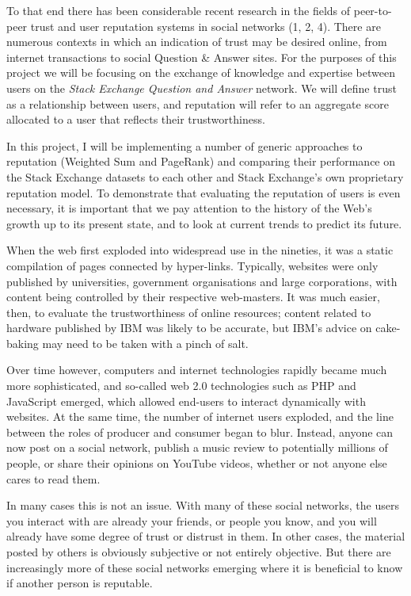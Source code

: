 \documentclass[]{final_report}
\begin{document}
To that end there has been considerable recent research in the fields of peer-to-peer trust and user reputation systems in social networks (1, 2, 4). There are numerous contexts in which an indication of trust may be desired online, from internet transactions to social Question \& Answer sites. For the purposes of this project we will be focusing on the exchange of knowledge and expertise between users on the \textsl{Stack Exchange Question and Answer} network. We will define trust as a relationship between users, and reputation will refer to an aggregate score allocated to a user that reflects their trustworthiness.

In this project, I will be implementing a number of generic approaches to reputation (Weighted Sum and PageRank) and comparing their performance on the Stack Exchange datasets to each other and Stack Exchange's own proprietary reputation model. To demonstrate that evaluating the reputation of users is even necessary, it is important that we pay attention to the history of the Web's growth up to its present state, and to look at current trends to predict its future.

When the web first exploded into widespread use in the nineties, it was a static compilation of pages connected by hyper-links. Typically, websites were only published by universities, government organisations and large corporations, with content being controlled by their respective web-masters. It was much easier, then, to evaluate the trustworthiness of online resources; content related to hardware published by IBM was likely to be accurate, but IBM's advice on cake-baking may need to be taken with a pinch of salt.

Over time however, computers and internet technologies rapidly became much more sophisticated, and so-called web 2.0 technologies such as PHP and JavaScript emerged, which allowed end-users to interact dynamically with websites. At the same time, the number of internet users exploded, and the line between the roles of producer and consumer began to blur. Instead, anyone can now post on a social network, publish a music review to potentially millions of people, or share their opinions on YouTube videos, whether or not anyone else cares to read them.

In many cases this is not an issue. With many of these social networks, the users you interact with are already your friends, or people you know, and you will already have some degree of trust or distrust in them. In other cases, the material posted by others is obviously subjective or not entirely objective. But there are increasingly more of these social networks emerging where it is beneficial to know if another person is reputable.
\end{document}
